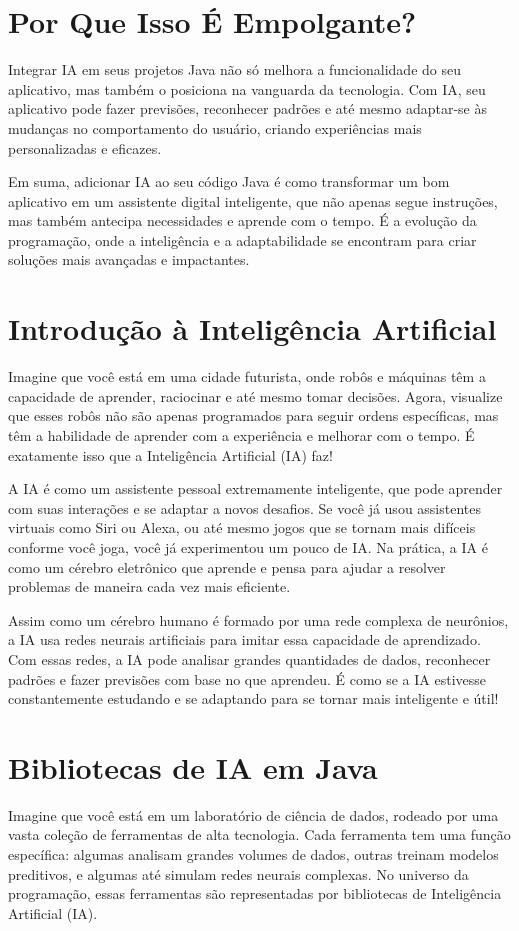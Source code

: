 \documentclass[a4paper,12pt]{book}
\begin{document}
\section*{Por Que Isso É Empolgante?}

Integrar IA em seus projetos Java não só melhora a funcionalidade do seu aplicativo, mas também o posiciona na vanguarda da tecnologia. Com IA, seu aplicativo pode fazer previsões, reconhecer padrões e até mesmo adaptar-se às mudanças no comportamento do usuário, criando experiências mais personalizadas e eficazes.

Em suma, adicionar IA ao seu código Java é como transformar um bom aplicativo em um assistente digital inteligente, que não apenas segue instruções, mas também antecipa necessidades e aprende com o tempo. É a evolução da programação, onde a inteligência e a adaptabilidade se encontram para criar soluções mais avançadas e impactantes.


\section{Introdução à Inteligência Artificial}
Imagine que você está em uma cidade futurista, onde robôs e máquinas têm a capacidade de aprender, raciocinar e até mesmo tomar decisões. Agora, visualize que esses robôs não são apenas programados para seguir ordens específicas, mas têm a habilidade de aprender com a experiência e melhorar com o tempo. É exatamente isso que a Inteligência Artificial (IA) faz!

A IA é como um assistente pessoal extremamente inteligente, que pode aprender com suas interações e se adaptar a novos desafios. Se você já usou assistentes virtuais como Siri ou Alexa, ou até mesmo jogos que se tornam mais difíceis conforme você joga, você já experimentou um pouco de IA. Na prática, a IA é como um cérebro eletrônico que aprende e pensa para ajudar a resolver problemas de maneira cada vez mais eficiente.

Assim como um cérebro humano é formado por uma rede complexa de neurônios, a IA usa redes neurais artificiais para imitar essa capacidade de aprendizado. Com essas redes, a IA pode analisar grandes quantidades de dados, reconhecer padrões e fazer previsões com base no que aprendeu. É como se a IA estivesse constantemente estudando e se adaptando para se tornar mais inteligente e útil!


\section{Bibliotecas de IA em Java}
Imagine que você está em um laboratório de ciência de dados, rodeado por uma vasta coleção de ferramentas de alta tecnologia. Cada ferramenta tem uma função específica: algumas analisam grandes volumes de dados, outras treinam modelos preditivos, e algumas até simulam redes neurais complexas. No universo da programação, essas ferramentas são representadas por bibliotecas de Inteligência Artificial (IA). 
\end{document}
